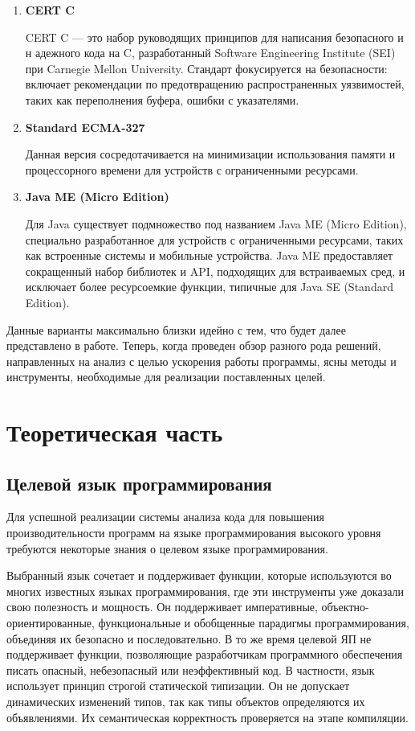 \documentclass{mipt-thesis-bs}
\begin{document}
\begin{enumerate}
        \item \textbf{CERT C}

        CERT C — это набор руководящих принципов для написания безопасного и н
        адежного кода на C, разработанный Software Engineering Institute (SEI) при Carnegie Mellon University.
        Стандарт фокусируется на безопасности: включает рекомендации по предотвращению
        распространенных уязвимостей, таких как переполнения буфера, ошибки с указателями.

        \item \textbf{Standard ECMA-327}

        Данная версия сосредотачивается на минимизации использования памяти и
        процессорного времени для устройств с ограниченными ресурсами.

        \item \textbf{Java ME (Micro Edition)}

        Для Java существует подмножество под названием Java ME (Micro Edition),
        специально разработанное для устройств с ограниченными ресурсами, таких
        как встроенные системы и мобильные устройства. Java ME предоставляет
        сокращенный набор библиотек и API, подходящих для встраиваемых сред,
        и исключает более ресурсоемкие функции, типичные для Java SE (Standard Edition).
\end{enumerate}

Данные варианты максимально близки идейно с тем, что будет далее представлено в работе.
Теперь, когда проведен обзор разного рода решений, направленных на анализ с целью ускорения
работы программы, ясны методы и инструменты, необходимые для реализации поставленных целей.


\chapter{Теоретическая часть}

\section{Целевой язык программирования}

Для успешной реализации системы анализа кода для повышения производительности программ на
языке программирования высокого уровня требуются некоторые знания о целевом языке программирования.

Выбранный язык сочетает и поддерживает функции, которые используются во многих известных
языках программирования, где эти инструменты уже доказали свою полезность и мощность.
Он поддерживает императивные, объектно-ориентированные, функциональные и обобщенные
 парадигмы программирования, объединяя их безопасно и последовательно.
В то же время целевой ЯП не поддерживает функции, позволяющие разработчикам
программного обеспечения писать опасный, небезопасный или неэффективный код.
В частности, язык использует принцип строгой статической типизации. Он не допускает
динамических изменений типов, так как типы объектов определяются их объявлениями.
Их семантическая корректность проверяется на этапе компиляции.
\end{document}

